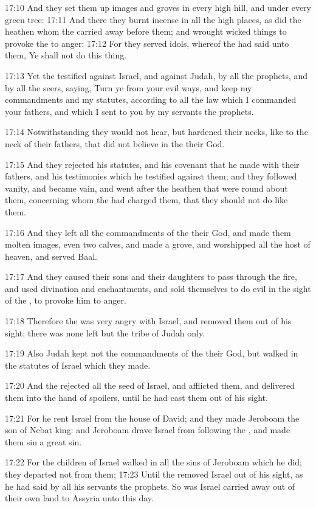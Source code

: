 17:10 And they set them up images and groves in every high hill, and
under every green tree: 17:11 And there they burnt incense in all the
high places, as did the heathen whom the \LORD carried away before
them; and wrought wicked things to provoke the \LORD to anger: 17:12
For they served idols, whereof the \LORD had said unto them, Ye shall
not do this thing.

17:13 Yet the \LORD testified against Israel, and against Judah, by all
the prophets, and by all the seers, saying, Turn ye from your evil
ways, and keep my commandments and my statutes, according to all the
law which I commanded your fathers, and which I sent to you by my
servants the prophets.

17:14 Notwithstanding they would not hear, but hardened their necks,
like to the neck of their fathers, that did not believe in the \LORD
their God.

17:15 And they rejected his statutes, and his covenant that he made
with their fathers, and his testimonies which he testified against
them; and they followed vanity, and became vain, and went after the
heathen that were round about them, concerning whom the \LORD had
charged them, that they should not do like them.

17:16 And they left all the commandments of the \LORD their God, and
made them molten images, even two calves, and made a grove, and
worshipped all the host of heaven, and served Baal.

17:17 And they caused their sons and their daughters to pass through
the fire, and used divination and enchantments, and sold themselves to
do evil in the sight of the \LORD, to provoke him to anger.

17:18 Therefore the \LORD was very angry with Israel, and removed them
out of his sight: there was none left but the tribe of Judah only.

17:19 Also Judah kept not the commandments of the \LORD their God, but
walked in the statutes of Israel which they made.

17:20 And the \LORD rejected all the seed of Israel, and afflicted
them, and delivered them into the hand of spoilers, until he had cast
them out of his sight.

17:21 For he rent Israel from the house of David; and they made
Jeroboam the son of Nebat king: and Jeroboam drave Israel from
following the \LORD, and made them sin a great sin.

17:22 For the children of Israel walked in all the sins of Jeroboam
which he did; they departed not from them; 17:23 Until the \LORD
removed Israel out of his sight, as he had said by all his servants
the prophets. So was Israel carried away out of their own land to
Assyria unto this day.

